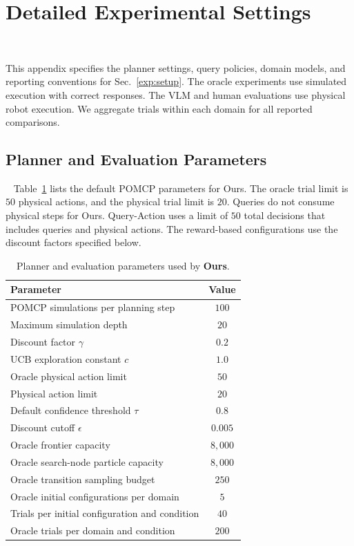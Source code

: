 \section{Detailed Experimental Settings}~\label{appx:settings}

This appendix specifies the planner settings, query policies, domain models, and reporting conventions for Sec.~\ref{exp:setup}. The oracle experiments use simulated execution with correct responses. The VLM and human evaluations use physical robot execution. We aggregate trials within each domain for all reported comparisons.

\subsection{Planner and Evaluation Parameters}~\label{appx:planner_params}
Table~\ref{tab:app_planner_params} lists the default POMCP parameters for Ours. The oracle trial limit is $50$ physical actions, and the physical trial limit is $20$. Queries do not consume physical steps for Ours. Query-Action uses a limit of $50$ total decisions that includes queries and physical actions.  The reward-based configurations use the discount factors specified below.

\begin{table}[!htbp]
\centering
\caption{Planner and evaluation parameters used by \textbf{Ours}.}
\label{tab:app_planner_params}
\small
\begin{tabular}{lc}
\toprule
\textbf{Parameter} & \textbf{Value} \\
\midrule
POMCP simulations per planning step & $100$ \\
Maximum simulation depth & $20$ \\
Discount factor $\gamma$ & $0.2$ \\
UCB exploration constant $c$ & $1.0$ \\
Oracle physical action limit & $50$ \\
Physical action limit & $20$ \\
Default confidence threshold $\tau$ & $0.8$ \\
Discount cutoff $\epsilon$ & $0.005$ \\
Oracle frontier capacity & $8{,}000$ \\
Oracle search-node particle capacity & $8{,}000$ \\
Oracle transition sampling budget & $250$ \\
Oracle initial configurations per domain & $5$ \\
Trials per initial configuration and condition & $40$ \\
Oracle trials per domain and condition & $200$ \\
\bottomrule
\end{tabular}
\end{table}

